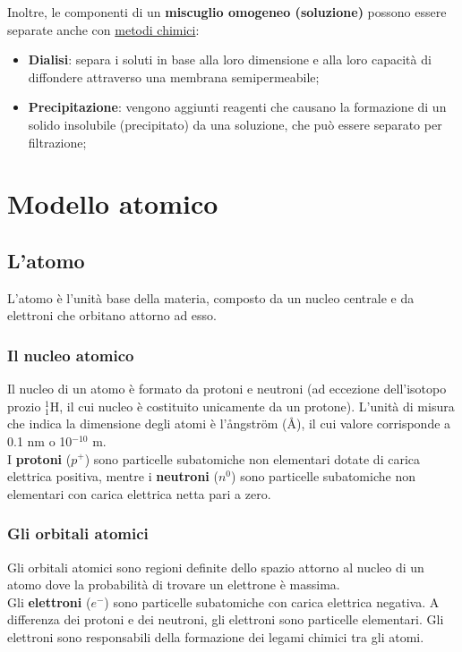 \documentclass{article}
\begin{document}
    Inoltre, le componenti di un \textbf{miscuglio omogeneo (soluzione)} possono essere separate anche con \underline{metodi chimici}:
        \begin{itemize}
            \item \textbf{Dialisi}: separa i soluti in base alla loro dimensione e alla loro capacità
                di diffondere attraverso una membrana semipermeabile;
            \item \textbf{Precipitazione}: vengono aggiunti reagenti che causano la formazione di un
                solido insolubile (precipitato) da una soluzione, che può essere separato per filtrazione;
        \end{itemize}
\pagebreak

\section{Modello atomico}
\subsection{L'atomo}
    L'atomo è l'unità base della materia, composto da un nucleo centrale e da elettroni che orbitano
    attorno ad esso.
        \subsubsection{Il nucleo atomico}
            Il nucleo di un atomo è formato da protoni e neutroni (ad eccezione dell'isotopo prozio $_1^1$H,
            il cui nucleo è costituito unicamente da un protone). L'unità di misura che indica la dimensione
            degli atomi è l'ångström (Å), il cui valore corrisponde a 0.1 nm o 10$^{-10}$ m.\\
            I \textbf{protoni} ($p^+$) sono particelle subatomiche non elementari dotate di carica elettrica positiva,
            mentre i \textbf{neutroni} ($n^0$) sono particelle subatomiche non elementari con carica elettrica netta pari
            a zero.
        \subsubsection{Gli orbitali atomici}
            Gli orbitali atomici sono regioni definite dello spazio attorno al nucleo di un
            atomo dove la probabilità di trovare un elettrone è massima.\\
            Gli \textbf{elettroni} ($e^-$) sono particelle subatomiche con carica elettrica negativa.
            A differenza dei protoni e dei neutroni, gli elettroni sono particelle elementari.
            Gli elettroni sono responsabili della formazione dei legami chimici tra gli atomi.
\end{document}
